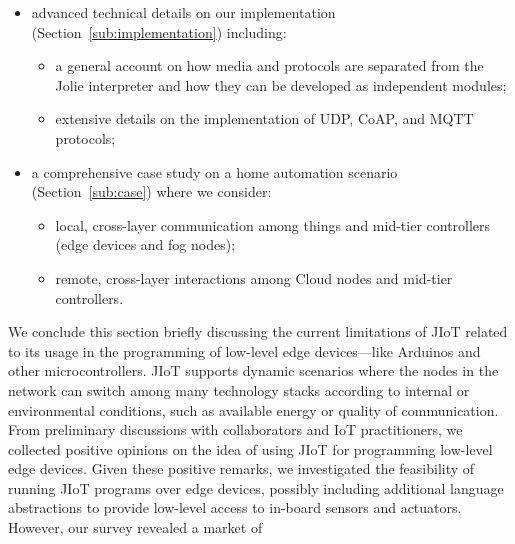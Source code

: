 \begin{itemize}

 \item advanced technical details on our implementation
       (Section~\ref{sub:implementation}) including:

       \begin{itemize}

        \item a general account on how media and protocols are separated from
              the Jolie interpreter and how they can be developed as independent
              modules;

        \item extensive details on the implementation of UDP, CoAP, and MQTT
              protocols;

       \end{itemize}

 \item a comprehensive case study on a home automation scenario
       (Section~\ref{sub:case}) where we consider:

       \begin{itemize}

        \item local, cross-layer communication among things and mid-tier
              controllers (edge devices and fog nodes);

        \item remote, cross-layer interactions among Cloud nodes and mid-tier
              controllers.

       \end{itemize}

\end{itemize}
%
We conclude this section briefly discussing the current limitations of JIoT
related to its usage in the programming of low-level edge devices---like
Arduinos and other microcontrollers. JIoT supports dynamic scenarios where the
nodes in the network can switch among many technology stacks according to
internal or environmental conditions, such as available energy or quality of
communication. From preliminary discussions with collaborators and IoT
practitioners, we collected positive opinions on the idea of using JIoT for
programming low-level edge devices. Given these positive remarks, we
investigated the feasibility of running JIoT programs over edge devices,
possibly including additional language abstractions to provide low-level access
to in-board sensors and actuators. However, our survey revealed a market of
